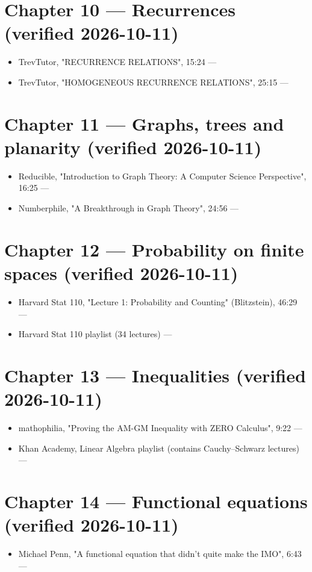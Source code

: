 \section*{Chapter 10 --- Recurrences (verified 2026-10-11)}
\begin{itemize}\setlength\itemsep{2pt}
  \item TrevTutor, "RECURRENCE RELATIONS", 15:24 ---
  \item TrevTutor, "HOMOGENEOUS RECURRENCE RELATIONS", 25:15 ---
\end{itemize}

\section*{Chapter 11 --- Graphs, trees and planarity (verified 2026-10-11)}
\begin{itemize}\setlength\itemsep{2pt}
  \item Reducible, "Introduction to Graph Theory: A Computer Science Perspective", 16:25 ---
  \item Numberphile, "A Breakthrough in Graph Theory", 24:56 ---
\end{itemize}

\section*{Chapter 12 --- Probability on finite spaces (verified 2026-10-11)}
\begin{itemize}\setlength\itemsep{2pt}
  \item Harvard Stat 110, "Lecture 1: Probability and Counting" (Blitzstein), 46:29 ---
  \item Harvard Stat 110 playlist (34 lectures) ---
\end{itemize}

\section*{Chapter 13 --- Inequalities (verified 2026-10-11)}
\begin{itemize}\setlength\itemsep{2pt}
  \item mathophilia, "Proving the AM-GM Inequality with ZERO Calculus", 9:22 ---
  \item Khan Academy, Linear Algebra playlist (contains Cauchy--Schwarz lectures) ---
\end{itemize}

\section*{Chapter 14 --- Functional equations (verified 2026-10-11)}
\begin{itemize}\setlength\itemsep{2pt}
  \item Michael Penn, "A functional equation that didn't quite make the IMO", 6:43 ---
\end{itemize}

